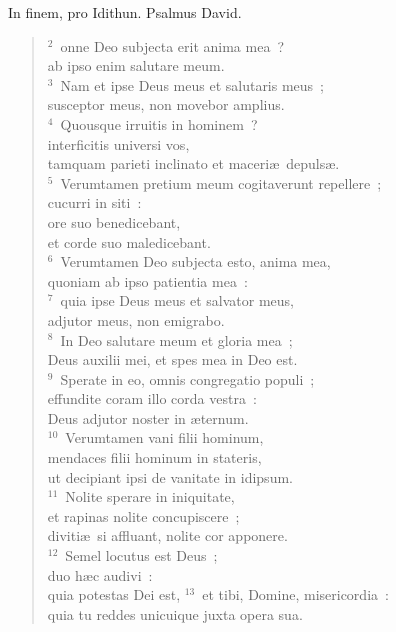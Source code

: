\bchapter[Psalm]
In finem, pro Idithun. Psalmus David.
\begin{verse}${}^{2}$~onne Deo subjecta erit anima mea~?\\ ab ipso enim salutare meum.\\
${}^{3}$~Nam et ipse Deus meus et salutaris meus~;\\ susceptor meus, non movebor amplius.\\
${}^{4}$~Quousque irruitis in hominem~?\\ interficitis universi vos,\\ tamquam parieti inclinato et maceri\ae\ depuls\ae .\\
${}^{5}$~Verumtamen pretium meum cogitaverunt repellere~;\\ cucurri in siti~:\\ ore suo benedicebant,\\ et corde suo maledicebant.\\
${}^{6}$~Verumtamen Deo subjecta esto, anima mea,\\ quoniam ab ipso patientia mea~:\\
${}^{7}$~quia ipse Deus meus et salvator meus,\\ adjutor meus, non emigrabo.\\
${}^{8}$~In Deo salutare meum et gloria mea~;\\ Deus auxilii mei, et spes mea in Deo est.\\
${}^{9}$~Sperate in eo, omnis congregatio populi~;\\ effundite coram illo corda vestra~:\\ Deus adjutor noster in \ae ternum.\\
${}^{10}$~Verumtamen vani filii hominum,\\ mendaces filii hominum in stateris,\\ ut decipiant ipsi de vanitate in idipsum.\\
${}^{11}$~Nolite sperare in iniquitate,\\ et rapinas nolite concupiscere~;\\ diviti\ae\ si affluant, nolite cor apponere.\\
${}^{12}$~Semel locutus est Deus~;\\ duo h\ae c audivi~:\\ quia potestas Dei est,
${}^{13}$~et tibi, Domine, misericordia~:\\ quia tu reddes unicuique juxta opera sua.\end{verse}



